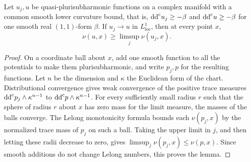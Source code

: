 \begin{lemma}\label{lem:lelong-lone-semicontinuity}
Let $u_j,u$ be quasi-plurisubharmonic functions on a complex manifold with a common smooth lower curvature bound, that is, $\mathrm{dd}^{\mathrm{c}} u_j\geq-\beta$ and $\mathrm{dd}^{\mathrm{c}} u\geq-\beta$ for one smooth real $(1,1)$-form $\beta$. If $u_j\to u$ in $L^1_{\mathrm{loc}}$, then at every point $x$,
\[
 \nu(u,x)\geq\limsup_j\nu(u_j,x).
\]
\end{lemma}
\begin{proof}
On a coordinate ball about $x$, add one smooth function to all the potentials to make them plurisubharmonic, and write $p_j,p$ for the resulting functions. Let $n$ be the dimension and $\kappa$ the Euclidean form of the chart. Distributional convergence gives weak convergence of the positive trace measures $\mathrm{dd}^{\mathrm{c}} p_j\wedge\kappa^{n-1}$ to $\mathrm{dd}^{\mathrm{c}} p\wedge\kappa^{n-1}$. For every sufficiently small radius $r$ such that the sphere of radius $r$ about $x$ has zero mass for the limit measure, the masses of the balls converge. The Lelong monotonicity formula bounds each $\nu(p_j,x)$ by the normalized trace mass of $p_j$ on such a ball. Taking the upper limit in $j$, and then letting these radii decrease to zero, gives $\limsup_j\nu(p_j,x)\leq\nu(p,x)$. Since smooth additions do not change Lelong numbers, this proves the lemma.
\end{proof}


